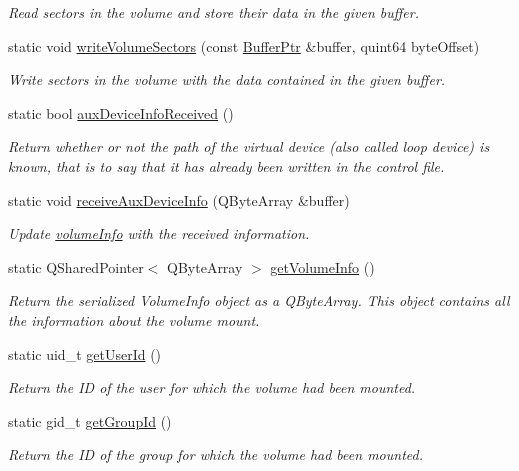\begin{DoxyCompactItemize}
\begin{DoxyCompactList}\small\item\em Read sectors in the volume and store their data in the given buffer. \end{DoxyCompactList}\item 
static void \hyperlink{class_gost_crypt_1_1_fuse_driver_1_1_fuse_service_a30816bb05f2a90ccceb72528c83d5758}{write\+Volume\+Sectors} (const \hyperlink{class_gost_crypt_1_1_buffer_ptr}{Buffer\+Ptr} \&buffer, quint64 byte\+Offset)
\begin{DoxyCompactList}\small\item\em Write sectors in the volume with the data contained in the given buffer. \end{DoxyCompactList}\item 
static bool \hyperlink{class_gost_crypt_1_1_fuse_driver_1_1_fuse_service_a070573d2fc37041d2359b24902366a0c}{aux\+Device\+Info\+Received} ()
\begin{DoxyCompactList}\small\item\em Return whether or not the path of the virtual device (also called loop device) is known, that is to say that it has already been written in the control file. \end{DoxyCompactList}\item 
static void \hyperlink{class_gost_crypt_1_1_fuse_driver_1_1_fuse_service_a4fd068071255017dfd44f33a28e358b5}{receive\+Aux\+Device\+Info} (Q\+Byte\+Array \&buffer)
\begin{DoxyCompactList}\small\item\em Update \hyperlink{structvolume_info}{volume\+Info} with the received information. \end{DoxyCompactList}\item 
static Q\+Shared\+Pointer$<$ Q\+Byte\+Array $>$ \hyperlink{class_gost_crypt_1_1_fuse_driver_1_1_fuse_service_affb0e817b2cf32cca44e161eadb1f75f}{get\+Volume\+Info} ()
\begin{DoxyCompactList}\small\item\em Return the serialized Volume\+Info object as a Q\+Byte\+Array. This object contains all the information about the volume mount. \end{DoxyCompactList}\item 
static uid\+\_\+t \hyperlink{class_gost_crypt_1_1_fuse_driver_1_1_fuse_service_a77061e84ee50b0d85c18bfe27536480a}{get\+User\+Id} ()
\begin{DoxyCompactList}\small\item\em Return the ID of the user for which the volume had been mounted. \end{DoxyCompactList}\item 
static gid\+\_\+t \hyperlink{class_gost_crypt_1_1_fuse_driver_1_1_fuse_service_a695ae71bede89ec373e3e04bf60e9c8e}{get\+Group\+Id} ()
\begin{DoxyCompactList}\small\item\em Return the ID of the group for which the volume had been mounted. \end{DoxyCompactList}\end{DoxyCompactItemize}
